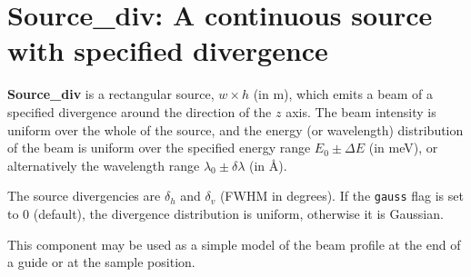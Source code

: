 \section{Source\_div: A continuous source with specified divergence}
\label{source-div}


{\bf Source\_div} is a rectangular source, $w \times h$ (in m), which emits a
beam of a specified divergence around the direction of the $z$ axis.
The beam intensity is uniform over
the whole of the source, and the energy (or wavelength) distribution
of the beam is uniform over the specified energy range
$E_0 \pm \Delta E$ (in meV), or alternatively
the wavelength range $\lambda_0 \pm \delta\lambda$ (in \AA ).

The source divergencies are $\delta_h$ and $\delta_v$ (FWHM in degrees).
If the \verb+gauss+ flag is set to 0 (default), 
the divergence distribution is uniform, otherwise it is Gaussian.

This component may be used as a simple model of the
beam profile at the end of a guide or at the sample position.

